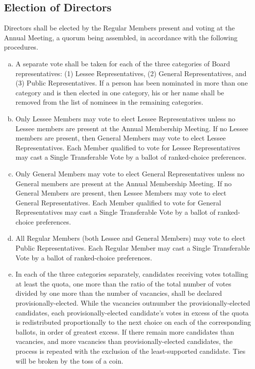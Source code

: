 \subsection{Election of Directors}
Directors shall be elected by the Regular Members present and voting
at the Annual Meeting, a quorum being assembled, in accordance with
the following procedures.
\begin{enumerate}[a.]
\item A separate vote shall be taken for each of the three categories
  of Board representatives: (1) Lessee Representatives, (2) General
  Representatives, and (3) Public Representatives. If a person has
  been nominated in more than one category and is then elected in one
  category, his or her name shall be removed from the list of nominees
  in the remaining categories.
\item Only Lessee Members may vote to elect Lessee Representatives
  unless no Lessee members are present at the Annual Membership
  Meeting. If no Lessee members are present, then General Members may
  vote to elect Lessee Representatives. Each Member qualified to vote
  for Lessee Representatives may cast a Single Transferable Vote by a
  ballot of ranked-choice preferences.
\item Only General Members may vote to elect General Representatives
  unless no General members are present at the Annual Membership
  Meeting. If no General Members are present, then Lessee Members may
  vote to elect General Representatives. Each Member qualified to vote
  for General Representatives may cast a Single Transferable Vote by a
  ballot of ranked-choice preferences.
\item All Regular Members (both Lessee and General Members) may vote
  to elect Public Representatives. Each Regular Member may cast a
  Single Transferable Vote by a ballot of ranked-choice preferences.
\item In each of the three categories separately, candidates receiving
  votes totalling at least the quota, one more than the ratio of the
  total number of votes divided by one more than the number of
  vacancies, shall be declared provisionally-elected. While the
  vacancies outnumber the provisionally-elected candidates, each
  provisionally-elected candidate’s votes in excess of the quota is
  redistributed proportionally to the next choice on each of the
  corresponding ballots, in order of greatest excess. If there remain
  more candidates than vacancies, and more vacancies than
  provisionally-elected candidates, the process is repeated with the
  exclusion of the least-supported candidate. Ties will be broken by
  the toss of a coin.
\end{enumerate}

